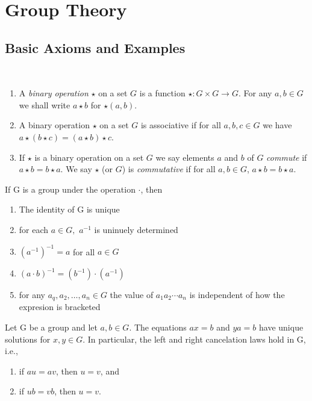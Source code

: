 \documentclass[../main]{subfiles}
\begin{document}
 
 \section{Group Theory}
 
 \subsection{Basic Axioms and Examples}
 
 
 \begin{dfn}
  ~\begin{enumerate}
   \item A \textit{binary operation} $\star$ on a set $G$ is a function $\star \colon G\times G \to G$. For any $a,b\in G$ we shall write $a\star b$ for $\star (a,b)$.
   \item A binary operation $\star$ on a set $G$ is associative if for all $a,b,c\in G$ we have $a\star (b\star c)=(a\star b)\star c$.
   \item If $\star$ is a binary operation on a set $G$ we say elements $a$ and $b$ of $G$ \textit{commute} if $a\star b = b\star a$. We say $\star$ (or $G$) is \textit{commutative} if for all $a,b\in G$, $a\star b = b\star a$.
  \end{enumerate}
 \end{dfn}
 
 \begin{prop}
  If G is a group under the operation $\cdot$, then
  \begin{enumerate}
   \item The identity of G is unique 
   \item for each $a \in G,$ $a^{-1}$ is uninuely determined
   \item $(a^{-1})^{-1} = a$ for all $a \in G$
   \item $(a\cdot b)^{-1}=(b^{-1})\cdot(a^{-1})$
   \item for any $a_q,a_2, \ldots,a_n\in G$ the value of $a_1 a_2 \cdots a_n$ is independent of how the expresion is bracketed 
  \end{enumerate}
 \end{prop}

 \begin{prop}
  Let G be a group and let $a,b\in G$. The equations $ax=b$ and $ya=b$ have unique solutions for $x,y \in G$. In particular, the left and right cancelation laws hold in G, i.e.,
  \begin{enumerate}
   \item if $au=av$, then $u=v$, and 
   \item if $ub=vb$, then $u=v$.
  \end{enumerate}
 \end{prop}
\end{document}
